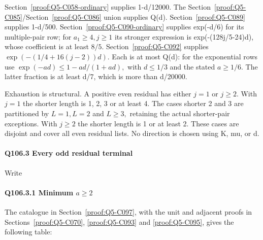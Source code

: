 Section~\ref{proof:Q5-C058-ordinary} supplies 1-d/12000. The Section~\ref{proof:Q5-C085}/Section~\ref{proof:Q5-C086} union supplies Q(d). Section~\ref{proof:Q5-C089}
supplies 1-d/500. Section~\ref{proof:Q5-C090-ordinary} supplies exp(-d/6) for its multiple-pair row;
for \(a_1\ge 4,\allowbreak  j\ge 1\) its stronger expression is
exp(-(128j/5-24)d), whose coefficient is at least \(8/5.\) Section~\ref{proof:Q5-C092} supplies
\(\exp(-(1/4+16(j-2))d).\) Each is at most Q(d): for the exponential rows
use \(\exp(-ad)\le 1-ad/(1+ad),\allowbreak \) with \(d\le 1/3\) and the stated \(a\ge 1/6.\)
The latter fraction is at least d/7, which is more than d/20000.

Exhaustion is structural. A positive even residual has either \(j=1\) or
\(j\ge 2.\) With \(j=1\) the shorter length is 1, 2, 3 or at least 4. The cases
shorter 2 and 3 are partitioned by \(L=1,\allowbreak  L=2\) and \(L\ge 3,\allowbreak \) retaining the
actual shorter-pair exceptions. With \(j\ge 2\) the shorter length is 1 or
at least 2. These cases are disjoint and cover all even residual lists.
No direction is chosen using K, mu, or d.

\paragraph{Q106.3 Every odd residual terminal}

Write


\paragraph{Q106.3.1 Minimum \(a\ge 2\)}

The catalogue in Section~\ref{proof:Q5-C097}, with the unit and adjacent proofs in Sections~\ref{proof:Q5-C070}, \ref{proof:Q5-C093} and \ref{proof:Q5-C095}, gives the following table:


